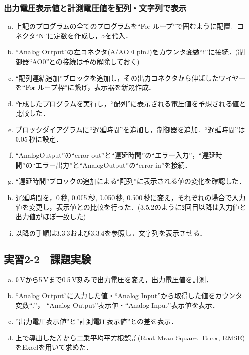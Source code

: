 \subsubsection{出力電圧表示値と計測電圧値を配列・文字列で表示}
\begin{enumerate}[a)]
	\item 上記のプログラムの全てのプログラムを``For ループ''で囲むように配置．コネクタ``N''に定数を作成し，5を代入．
	\item ``Analog Output''の左コネクタ(A/AO 0 pin2)をカウンタ変数``i''に接続．(制御器``AO0''との接続は予め解除しておく)
	\item ``配列連結追加''ブロックを追加し，その出力コネクタから伸ばしたワイヤーを``For ループ枠''に繋げ，表示器を新規作成．
	\item 作成したプログラムを実行し，``配列''に表示される電圧値を予想される値と比較した．
	\item ブロックダイアグラムに``遅延時間''を追加し，制御器を追加．``遅延時間''は0.05\,秒に設定．
	\item ``AnalogOutput''の``error out''と``遅延時間''の``エラー入力''，``遅延時間''の``エラー出力''と``AnalogOutput''の``error in''を接続．
	\item ``遅延時間''ブロックの追加による``配列''に表示される値の変化を確認した．
	\item 遅延時間を，0\,秒, 0.005\,秒, 0.050\,秒, 0.500\,秒に変え，それぞれの場合で入力値を変更し，表示値との比較を行った．(3.5.2のように2回目以降は入力値と出力値がほぼ一致した)
	\item 以降の手順は3.3.3および3.3.4を参照し，文字列を表示させる．
\end{enumerate}


\subsection{実習2-2　課題実験}
\begin{enumerate}[a)]
	\item 0\,\rm{V}から5\,\rm{V}まで0.5\,\rm{V}刻みで出力電圧を変え，出力電圧値を計測．
	\item ``Analog Output''に入力した値・``Analog Input''から取得した値をカウンタ変数``i''， ``Analog Output''表示値・``Analog Input''表示値を表示．
	\item ``出力電圧表示値''と``計測電圧表示値''との差を表示．
	\item 上で導出した差から二乗平均平方根誤差(Root Mean Squared Error, RMSE)をExcelを用いて求めた．
\end{enumerate}


